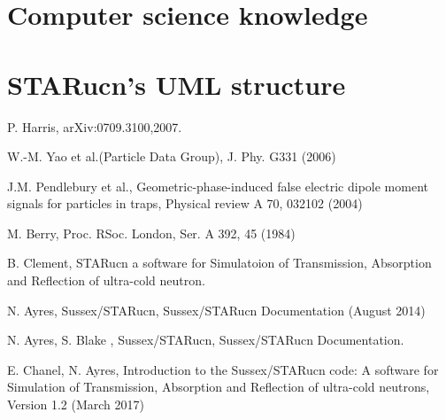 \documentclass[a4paper]{book}
\begin{document}

\appendixpage
{}
\renewcommand{\thesection}{\Alph{section}}

\begin{appendices}
\section{Computer science knowledge}

\section{STARucn's UML structure }


\end{appendices}


\begin{thebibliography}{9}
P. Harris, arXiv:0709.3100,2007.

 W.-M. Yao et al.(Particle Data Group), J. Phy. G331 (2006)

J.M. Pendlebury et al., Geometric-phase-induced false electric dipole moment signals for particles in traps, Physical review A 70, 032102 (2004)

M. Berry, Proc. RSoc. London, Ser. A 392, 45 (1984)

B. Clement, STARucn a software for Simulatoion of Transmission, Absorption and Reflection of ultra-cold neutron.

N. Ayres, Sussex/STARucn, Sussex/STARucn Documentation (August 2014)

N. Ayres, S. Blake , Sussex/STARucn, Sussex/STARucn Documentation.

E. Chanel, N. Ayres, Introduction to the Sussex/STARucn code: A software for Simulation of Transmission, Absorption and Reflection of ultra-cold neutrons, Version 1.2  (March 2017)
\end{thebibliography}
\end{document}
